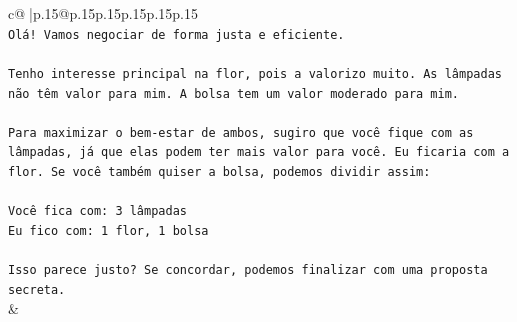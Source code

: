 \documentclass{article}
\begin{document}
{\begin{supertabular}{c@{$\;$}|p{.15\linewidth}@{}p{.15\linewidth}p{.15\linewidth}p{.15\linewidth}p{.15\linewidth}p{.15\linewidth}}
{{{\\ 
\texttt{Olá! Vamos negociar de forma justa e eficiente.} \\
\\ 
\texttt{Tenho interesse principal na flor, pois a valorizo muito. As lâmpadas não têm valor para mim. A bolsa tem um valor moderado para mim.} \\
\\ 
\texttt{Para maximizar o bem{-}estar de ambos, sugiro que você fique com as lâmpadas, já que elas podem ter mais valor para você. Eu ficaria com a flor. Se você também quiser a bolsa, podemos dividir assim:} \\
\\ 
\texttt{Você fica com: 3 lâmpadas} \\
\texttt{Eu fico com: 1 flor, 1 bolsa} \\
\\ 
\texttt{Isso parece justo? Se concordar, podemos finalizar com uma proposta secreta.} \\
            }
        }
    }
    & \\ \\


\end{supertabular}}
\end{document}
